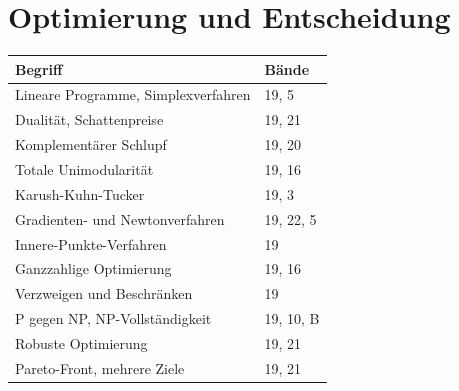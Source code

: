 \section*{Optimierung und Entscheidung}
\nopagebreak
{\small\renewcommand{\arraystretch}{1.32}
\begin{longtable}{@{}P{5.6cm}P{2.8cm}@{}}
\toprule
\textbf{Begriff} & \textbf{Bände}\\
\midrule
\endhead
Lineare Programme, Simplexverfahren & 19, 5\\
Dualität, Schattenpreise & 19, 21\\
Komplementärer Schlupf & 19, 20\\
Totale Unimodularität & 19, 16\\
Karush-Kuhn-Tucker & 19, 3\\
Gradienten- und Newtonverfahren & 19, 22, 5\\
Innere-Punkte-Verfahren & 19\\
Ganzzahlige Optimierung & 19, 16\\
Verzweigen und Beschränken & 19\\
P gegen NP, NP-Vollständigkeit & 19, 10, B\\
Robuste Optimierung & 19, 21\\
Pareto-Front, mehrere Ziele & 19, 21\\
\bottomrule
\end{longtable}}

